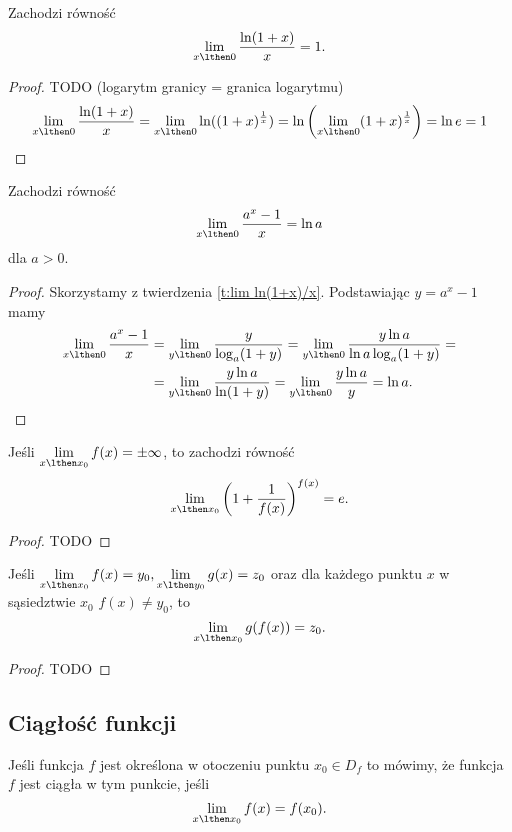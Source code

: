 \documentclass[11pt]{scrartcl}
\begin{document}
    \begin{theorem}
        \label{t:lim ln(1+x)/x}
        Zachodzi równość
        \[ \lim_{x\lthen 0}\frac{\ln(1 + x)}{x} = 1. \]
    \end{theorem}
    \begin{proof}
        TODO (logarytm granicy = granica logarytmu)
        \[ \lim_{x\lthen 0}\frac{\ln(1 + x)}{x} = \lim_{x\lthen 0} \ln((1 + x)^{\frac{1}{x}}) = \ln\left(\lim_{x\lthen 0} (1 + x)^{\frac{1}{x}}\right) = \ln e = 1 \]
    \end{proof}

    \begin{theorem}
        Zachodzi równość
        \[ \lim_{x\lthen 0}\frac{a^x - 1}{x} = \ln a \]
        dla $a > 0$.
    \end{theorem}
    \begin{proof}
        Skorzystamy z twierdzenia \ref{t:lim ln(1+x)/x}. Podstawiając $y = a^x - 1$ mamy
        \begin{align*} \lim_{x\lthen 0}\frac{a^x - 1}{x} &= \lim_{y\lthen 0}\frac{y}{\log_a(1 + y)} = \lim_{y\lthen 0}\frac{y\ln{a}}{\ln {a}\log_a(1 + y)} = \\
        &= \lim_{y\lthen 0}\frac{y\ln{a}}{\ln(1 + y)} = \lim_{y\lthen 0}\frac{y\ln{a}}{y} = \ln{a}. \end{align*}
    \end{proof}

    \begin{theorem}
        Jeśli $\lim\limits_{x\lthen x_0} f(x) = \pm\infty$, to zachodzi równość
        \[ \lim_{x\lthen x_0}\left(1 + \frac{1}{f(x)}\right)^{f(x)} = e. \]
    \end{theorem}
    \begin{proof}
        TODO
    \end{proof}

    \begin{theorem}
        Jeśli $\lim\limits_{x\lthen x_0} f(x) = y_0, \lim\limits_{x\lthen y_0} g(x) = z_0$ oraz dla każdego punktu $x$ w sąsiedztwie $x_0$ $f(x) \neq y_0$, to
        \[ \lim_{x\lthen x_0} g(f(x)) = z_0. \]
    \end{theorem}
    \begin{proof}
        TODO
    \end{proof}

    \subsection{Ciągłość funkcji}
    \begin{definition}
        Jeśli funkcja $f$ jest określona w otoczeniu punktu $x_0 \in D_f$ to mówimy, że funkcja $f$ jest ciągła w tym punkcie, jeśli
        \[ \lim_{x \lthen x_0} f(x) = f(x_0). \]
    \end{definition}
\end{document}
